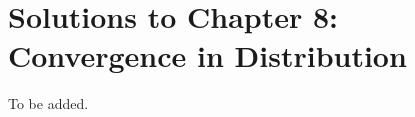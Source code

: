 \section{Solutions to Chapter 8: Convergence in Distribution}
\label{sec:solutions-chapter-8}

\setcounter{Lcount}{0}
\begin{list}{8.8.}{}
\item To be added.
\end{list}

\clearpage{}

